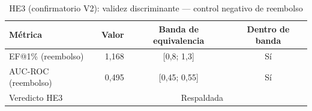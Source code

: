 \begin{table}[htbp]
\centering
\small
\caption{HE3 (confirmatorio V2): validez discriminante — control negativo de reembolso}
\label{tab:v2-he3-negative-control}
\begin{tabular}{lrcc}
\toprule
Métrica & Valor & Banda de equivalencia & Dentro de banda \\
\midrule
  EF@1\% (reembolso) & 1,168 & [0,8; 1,3] & Sí \\
  AUC-ROC (reembolso) & 0,495 & [0,45; 0,55] & Sí \\
\midrule
  Veredicto HE3 & \multicolumn{3}{c}{Respaldada} \\
\bottomrule
\end{tabular}
\end{table}

